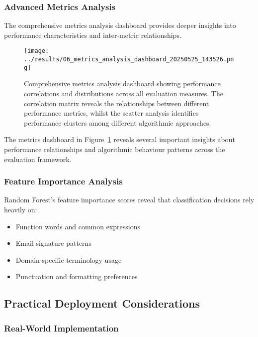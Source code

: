 \documentclass[11pt,a4paper]{article}
\begin{document}
\subsubsection{Advanced Metrics Analysis}

The comprehensive metrics analysis dashboard provides deeper insights into performance characteristics and inter-metric relationships.

\begin{figure}[H]
    \centering
    \texttt{[image: ../results/06\_metrics\_analysis\_dashboard\_20250525\_143526.png]}
    \caption{Comprehensive metrics analysis dashboard showing performance correlations and distributions across all evaluation measures. The correlation matrix reveals the relationships between different performance metrics, whilst the scatter analysis identifies performance clusters among different algorithmic approaches.}
    \label{fig:metrics_dashboard}
\end{figure}

The metrics dashboard in Figure~\ref{fig:metrics_dashboard} reveals several important insights about performance relationships and algorithmic behaviour patterns across the evaluation framework.

\subsubsection{Feature Importance Analysis}

Random Forest's feature importance scores reveal that classification decisions rely heavily on:

\begin{itemize}
    \item Function words and common expressions
    \item Email signature patterns
    \item Domain-specific terminology usage
    \item Punctuation and formatting preferences
\end{itemize}

\subsection{Practical Deployment Considerations}

\subsubsection{Real-World Implementation}
\end{document}
